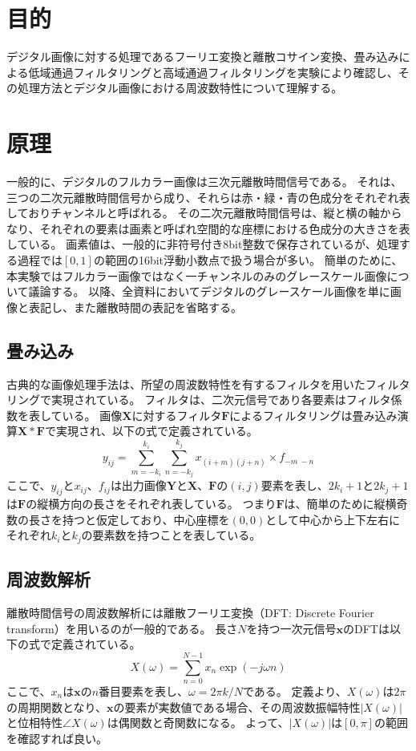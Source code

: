 \documentclass[11pt,a4paper]{jsarticle}
\begin{document}
	
\section{目的}
	デジタル画像に対する処理であるフーリエ変換と離散コサイン変換、畳み込みによる低域通過フィルタリングと高域通過フィルタリングを実験により確認し、その処理方法とデジタル画像における周波数特性について理解する。
	
\section{原理}
一般的に、デジタルのフルカラー画像は三次元離散時間信号である。
それは、三つの二次元離散時間信号から成り、それらは赤・緑・青の色成分をそれぞれ表しておりチャンネルと呼ばれる。
その二次元離散時間信号は、縦と横の軸からなり、それぞれの要素は画素と呼ばれ空間的な座標における色成分の大きさを表している。
画素値は、一般的に非符号付き8bit整数で保存されているが、処理する過程では$[0, 1]$の範囲の16bit浮動小数点で扱う場合が多い。
簡単のために、本実験ではフルカラー画像ではなく一チャンネルのみのグレースケール画像について議論する。
以降、全資料においてデジタルのグレースケール画像を単に画像と表記し、また離散時間の表記を省略する。


\subsection{畳み込み}
古典的な画像処理手法は、所望の周波数特性を有するフィルタを用いたフィルタリングで実現されている。
フィルタは、二次元信号であり各要素はフィルタ係数を表している。
画像$\mathbf{X}$に対するフィルタ$\mathbf{F}$によるフィルタリングは畳み込み演算$\mathbf{X}\ast\mathbf{F}$で実現され、以下の式で定義されている。
\begin{equation}
	y_{ij} = \sum^{k_i}_{m=-k_i}\sum^{k_j}_{n=-k_j}
	x_{(i+m)(j+n)}\times f_{-m\ -n}
	\label{eq:Conv}
\end{equation}
ここで、$y_{ij}$と$x_{ij}$、$f_{ij}$は出力画像$\mathbf{Y}$と$\mathbf{X}$、$\mathbf{F}$の$(i,j)$要素を表し、$2k_i+1$と$2k_j+1$は$\mathbf{F}$の縦横方向の長さをそれぞれ表している。
つまり$\mathbf{F}$は、簡単のために縦横奇数の長さを持つと仮定しており、中心座標を$(0,0)$として中心から上下左右にそれぞれ$k_i$と$k_j$の要素数を持つことを表している。


\subsection{周波数解析}\label{sec:Fourier}
離散時間信号の周波数解析には離散フーリエ変換（DFT: Discrete Fourier transform）を用いるのが一般的である。
長さ$N$を持つ一次元信号$\bm{x}$のDFTは以下の式で定義されている。
\begin{equation}
	X(\omega)=\sum^{N-1}_{n=0}x_n\exp
	\left(-j\omega n\right)
	\label{eq:DFT}
\end{equation}
ここで、$x_n$は$\bm{x}$の$n$番目要素を表し、$\omega=2\pi k/N$である。
定義より、$X(\omega)$は$2\pi$の周期関数となり、$\bm{x}$の要素が実数値である場合、その周波数振幅特性$|X(\omega)|$と位相特性$\angle X(\omega)$は偶関数と奇関数になる。
よって、$|X(\omega)|$は$[0, \pi]$の範囲を確認すれば良い。
\end{document}
